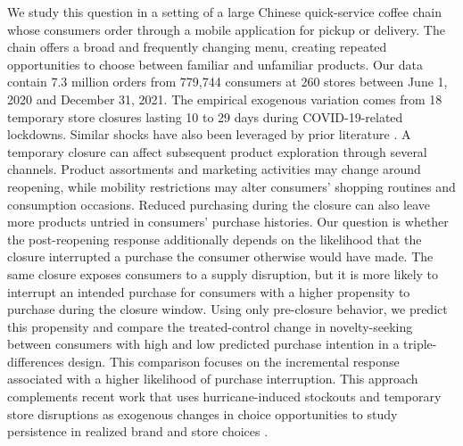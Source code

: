 \documentclass[11 pt]{article}
\begin{document}
We study this question in a setting of a large Chinese quick-service coffee chain whose consumers order through a mobile application for pickup or delivery. The chain offers a broad and frequently changing menu, creating repeated opportunities to choose between familiar and unfamiliar products. Our data contain 7.3 million orders from 779,744 consumers at 260 stores between June 1, 2020 and December 31, 2021. The empirical exogenous variation comes from 18 temporary store closures lasting 10 to 29 days during COVID-19-related lockdowns. Similar shocks have also been leveraged by prior literature \citep{seenivasan2016store,levine2023state,ye2025close}. A temporary closure can affect subsequent product exploration through several channels. Product assortments and marketing activities may change around reopening, while mobility restrictions may alter consumers' shopping routines and consumption occasions. Reduced purchasing during the closure can also leave more products untried in consumers' purchase histories. Our question is whether the post-reopening response additionally depends on the likelihood that the closure interrupted a purchase the consumer otherwise would have made. The same closure exposes consumers to a supply disruption, but it is more likely to interrupt an intended purchase for consumers with a higher propensity to purchase during the closure window. Using only pre-closure behavior, we predict this propensity and compare the treated-control change in novelty-seeking between consumers with high and low predicted purchase intention in a triple-differences design. This comparison focuses on the incremental response associated with a higher likelihood of purchase interruption. This approach complements recent work that uses hurricane-induced stockouts and temporary store disruptions as exogenous changes in choice opportunities to study persistence in realized brand and store choices \citep{levine2023state,Levine2026}.
\end{document}
